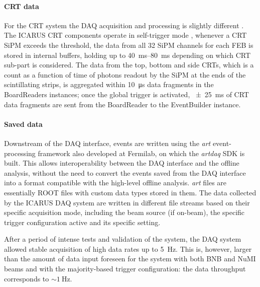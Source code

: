 \paragraph{CRT data} For the CRT system the DAQ acquisition and processing is slightly different \cite{ICARUS:2025rdw,Poppi:2023zmp,Poppi:2022vhg}. The ICARUS CRT components operate in self-trigger mode \cite{arteroponsStudyReconstructionNuMuCC, ICARUS:2025rdw}, whenever a CRT SiPM exceeds the threshold, the data from all 32 SiPM channels for each FEB is stored in internal buffers, holding up to \qtyrange{40}{80}{\ms} depending on which CRT sub-part is considered. The data from the top, bottom and side CRTs, which is a count as a function of time of photons readout by the SiPM at the ends of the scintillating strips, is aggregated within \SI{10}{\us} data fragments in the BoardReaders instances; once the global trigger is activated, \SI{+-25}{\ms} of CRT data fragments are sent from the BoardReader to the EventBuilder instance. 

\paragraph{Saved data} Downstream of the DAQ interface, events are written using the \emph{art} event-processing framework \cite{greenArtFramework2012} also developed at Fermilab, on which the \emph{artdaq} SDK is built. This allows interoperability between the DAQ interface and the offline analysis, without the need to convert the events saved from the DAQ interface into a format compatible with the high-level offline analysis. \emph{art} files are essentially ROOT files \cite{rene_brun_2019_3895860} with custom data types stored in them. The data collected by the ICARUS DAQ system are written in different file streams based on their specific acquisition mode, including the beam source (if on-beam), the specific trigger configuration active and its specific setting.

After a period of intense tests and validation of the system, the DAQ system allowed stable acquisition of high data rates up to \SI{5}{\hertz}. This is, however, larger than the amount of data input foreseen for the system with both BNB and NuMI beams and with the majority-based trigger configuration: the data throughput corresponds to ${\sim}\SI{1}{\hertz}$.


